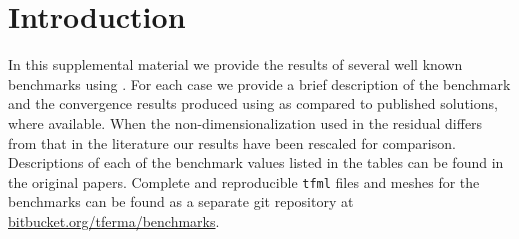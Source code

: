 %
%
%
%
%

\chapter{Introduction} \label{sec:app}

In this supplemental material we provide the results of several well known benchmarks using \TF{}.  For each case we provide a brief description of the benchmark and the convergence results produced using \TF{} as compared to published solutions, where available.  When the non-dimensionalization used in the residual differs from that in the literature our results have been rescaled for comparison. Descriptions of each of the benchmark values listed in the tables can be found in the original papers.   Complete and reproducible \texttt{tfml} files and meshes for  the benchmarks can be found as a separate git repository at \url{bitbucket.org/tferma/benchmarks}.



